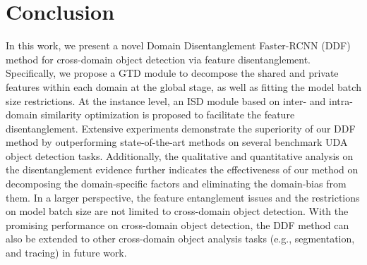 \documentclass[journal]{IEEEtran}
\begin{document}
\section{Conclusion}

In this work, we present a novel Domain Disentanglement Faster-RCNN (DDF) method for cross-domain object detection via feature disentanglement. Specifically, we propose a GTD module to decompose the shared and private features within each domain at the global stage, as well as fitting the model batch size restrictions. At the instance level, an ISD module based on inter- and intra-domain similarity optimization is proposed to facilitate the feature disentanglement. Extensive experiments demonstrate the superiority of our DDF method by outperforming state-of-the-art methods on several benchmark UDA object detection tasks. Additionally, the qualitative and quantitative analysis on the disentanglement evidence further indicates the effectiveness of our method on decomposing the domain-specific factors and eliminating the domain-bias from them. In a larger perspective, the feature entanglement issues and the restrictions on model batch size are not limited to cross-domain object detection. With the promising performance on cross-domain object detection, the DDF method can also be extended to other cross-domain object analysis tasks (e.g., segmentation, and tracing) in future work.

{\small




}
\end{document}
